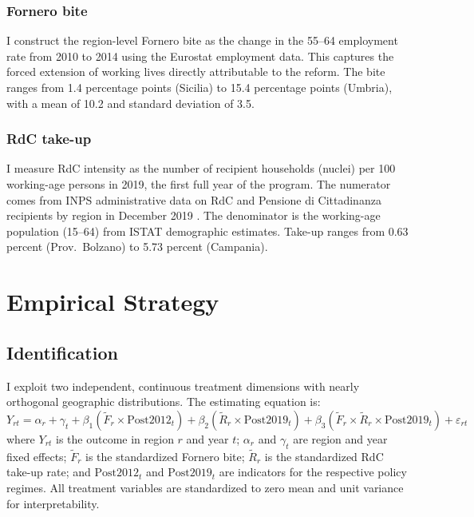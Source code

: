 \documentclass[12pt]{article}
\begin{document}
\subsubsection*{Fornero bite} I construct the region-level Fornero bite as the change in the 55--64 employment rate from 2010 to 2014 using the Eurostat employment data. This captures the forced extension of working lives directly attributable to the reform. The bite ranges from 1.4 percentage points (Sicilia) to 15.4 percentage points (Umbria), with a mean of 10.2 and standard deviation of 3.5.

\subsubsection*{RdC take-up} I measure RdC intensity as the number of recipient households (nuclei) per 100 working-age persons in 2019, the first full year of the program. The numerator comes from INPS administrative data on RdC and Pensione di Cittadinanza recipients by region in December 2019 \citep{inps2019rdc}. The denominator is the working-age population (15--64) from ISTAT demographic estimates. Take-up ranges from 0.63 percent (Prov.\ Bolzano) to 5.73 percent (Campania).




\section{Empirical Strategy}
\label{sec:strategy}

\subsection{Identification}

I exploit two independent, continuous treatment dimensions with nearly orthogonal geographic distributions. The estimating equation is:
\begin{equation}
Y_{rt} = \alpha_r + \gamma_t + \beta_1 (\widetilde{F}_r \times \text{Post2012}_t) + \beta_2 (\widetilde{R}_r \times \text{Post2019}_t) + \beta_3 (\widetilde{F}_r \times \widetilde{R}_r \times \text{Post2019}_t) + \varepsilon_{rt}
\label{eq:main}
\end{equation}
where $Y_{rt}$ is the outcome in region $r$ and year $t$; $\alpha_r$ and $\gamma_t$ are region and year fixed effects; $\widetilde{F}_r$ is the standardized Fornero bite; $\widetilde{R}_r$ is the standardized RdC take-up rate; and $\text{Post2012}_t$ and $\text{Post2019}_t$ are indicators for the respective policy regimes. All treatment variables are standardized to zero mean and unit variance for interpretability.
\end{document}
